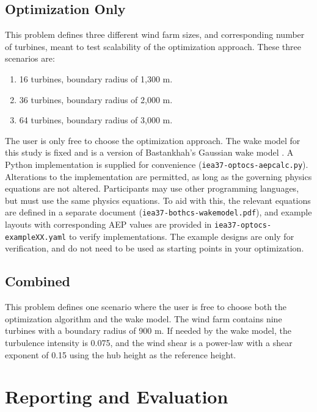 \documentclass{article}
\begin{document}
    \subsection{Optimization Only}

        This problem defines three different wind farm sizes, and corresponding number of turbines, meant to test scalability of the optimization approach.  These three scenarios are:
        \begin{enumerate}
            \item 16 turbines, boundary radius of 1,300 m.
            \item 36 turbines, boundary radius of 2,000 m.
            \item 64 turbines, boundary radius of 3,000 m.
        \end{enumerate}

        The user is only free to choose the optimization approach.  The wake model for this study is fixed and is a version of Bastankhah's Gaussian wake model \cite{Thomas2018, Bastankhah2014, Bastankhah2016}.  A Python implementation is supplied for convenience (\texttt{iea37-optocs-aepcalc.py}). Alterations to the implementation are permitted, as long as the governing physics equations are not altered.  Participants may use other programming languages, but must use the same physics equations.  To aid with this, the relevant equations are defined in a separate document (\texttt{iea37-bothcs-wakemodel.pdf}), and example layouts with corresponding AEP values are provided in \texttt{iea37-optocs-exampleXX.yaml} to verify implementations.  The example designs are only for verification, and do not need to be used as starting points in your optimization.  

    \subsection{Combined}

        This problem defines one scenario where the user is free to choose both the optimization algorithm and the wake model.  The wind farm contains nine turbines with a boundary radius of 900 m.  If needed by the wake model, the turbulence intensity is 0.075, and the wind shear is a power-law with a shear exponent of 0.15 using the hub height as the reference height.

\section{Reporting and Evaluation}
\end{document}
